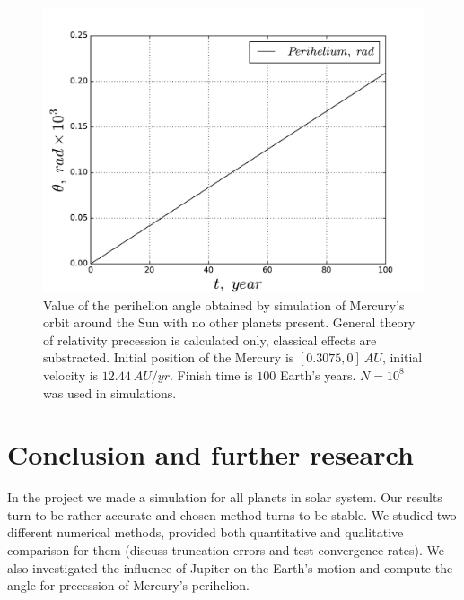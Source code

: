 \documentclass[10pt]{article}
\begin{document}
\begin{figure}[ht]
  \begin{center}
    \includegraphics[scale=0.5]{mercury}
    \caption {Value of the perihelion angle obtained by simulation of Mercury’s orbit around the Sun with no other planets present. General theory of relativity precession is calculated only, classical effects are substracted. Initial position of the Mercury is $[0.3075,0]\ AU$, initial velocity is $12.44\ AU/yr$. Finish time is $100$ Earth's years. $N=10^8$ was used in simulations. }
    \label{fig:perihelion}
  \end{center}
\end{figure}
\clearpage

\newpage
\section{Conclusion and further research}\label{conc}
In the project we made a simulation for all planets in solar system. Our results turn to be rather accurate and chosen method turns to be stable. We studied two different numerical methods, provided both quantitative and qualitative comparison for them (discuss truncation errors and test convergence rates). We also investigated the influence of Jupiter on the Earth's motion and compute the angle for precession of Mercury's perihelion.
\end{document}
